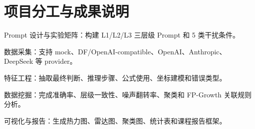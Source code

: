 
\chapter{项目分工与成果说明}

\begin{publist}
    \item Prompt 设计与实验矩阵：构建 L1/L2/L3 三层级 Prompt 和 5 类干扰条件。
    \item 数据采集：支持 mock、DF/OpenAI-compatible、OpenAI、Anthropic、DeepSeek 等 provider。
    \item 特征工程：抽取最终判断、推理步骤、公式使用、坐标建模和错误类型。
    \item 数据挖掘：完成准确率、层级一致性、噪声翻转率、聚类和 FP-Growth 关联规则分析。
    \item 可视化与报告：生成热力图、雷达图、聚类图、统计表和课程报告框架。
\end{publist}
